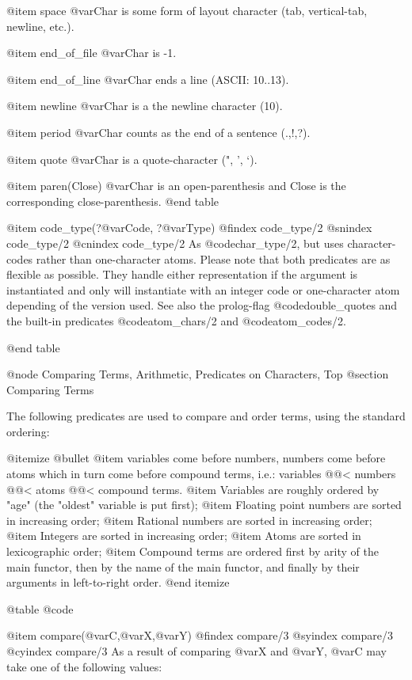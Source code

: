 {{{{@item    space
        @var{Char} is some form of layout character (tab, vertical-tab, newline, etc.).

@item    end_of_file
        @var{Char} is -1.

@item    end_of_line
        @var{Char} ends a line (ASCII: 10..13).

@item    newline
        @var{Char} is a the newline character (10).

@item    period
        @var{Char} counts as the end of a sentence (.,!,?).

@item    quote
        @var{Char} is a quote-character (", ', `).

@item    paren(Close)
        @var{Char} is an open-parenthesis and Close is the corresponding close-parenthesis. 
@end table

@item code_type(?@var{Code}, ?@var{Type})
@findex code_type/2
@snindex code_type/2
@cnindex code_type/2
    As @code{char_type/2}, but uses character-codes rather than
    one-character atoms. Please note that both predicates are as
    flexible as possible. They handle either representation if the
    argument is instantiated and only will instantiate with an integer
    code or one-character atom depending of the version used. See also
    the prolog-flag @code{double_quotes} and the built-in predicates 
    @code{atom_chars/2} and @code{atom_codes/2}.

@end table

@node Comparing Terms, Arithmetic, Predicates on Characters, Top
@section Comparing Terms

The following predicates are used to compare and order terms, using the
standard ordering:

@itemize @bullet
@item
variables come before numbers, numbers come before atoms which in turn
come before compound terms, i.e.: variables @@< numbers @@< atoms @@<
compound terms.
@item
Variables are roughly ordered by "age" (the "oldest" variable is put
first);
@item
Floating point numbers are sorted in increasing order;
@item
Rational numbers are sorted in increasing order;
@item
Integers are sorted in increasing order;
@item
Atoms are sorted in lexicographic order;
@item
Compound terms are ordered first by arity of the main functor, then by
the name of the main functor, and finally by their arguments in
left-to-right order.
@end itemize

@table @code

@item compare(@var{C},@var{X},@var{Y})
@findex compare/3
@syindex compare/3
@cyindex compare/3
As a result of comparing @var{X} and @var{Y}, @var{C} may take one of
the following values:

}}}}
